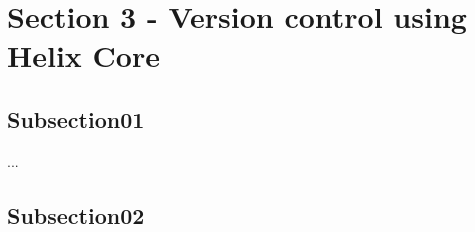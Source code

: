 \section{Section 3 - Version control using Helix Core\textsuperscript{\texttrademark}}
    \subsection{Subsection01}
    ...

    \subsection{Subsection02}
